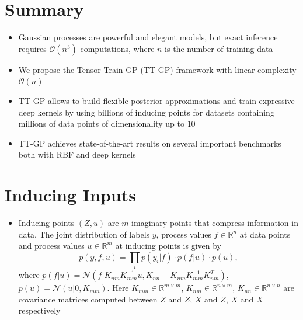 \documentclass[a0,portrait]{a0poster}
\newcommand{\Knn}{K_{nn}}
\newcommand{\Knm}{K_{nm}}
\newcommand{\Kmm}{K_{mm}}
\newcommand{\R}{\mathbb{R}}
\newcommand{\N}{\mathcal{N}}
\newcommand{\bigO}{\mathcal{O}}
\begin{document}
\large


\begin{multicols}{2} %


%

\section*{\LARGE \color{NavyBlue}Summary}

\begin{itemize}
  \item Gaussian processes are powerful and elegant models, but exact inference 
    requires $\bigO(n^3)$ computations, where $n$ is the number of training data
  \item We propose the Tensor Train GP (TT-GP) framework with 
    linear complexity  $\bigO(n)$ 
  \item TT-GP allows to build flexible posterior approximations and train
    expressive deep kernels by using billions of inducing points for datasets
    containing millions of data points of dimensionality up to $10$
  \item TT-GP achieves state-of-the-art results on several important benchmarks
    both with RBF and deep kernels
\end{itemize}

\section*{\LARGE \color{NavyBlue}Inducing Inputs}

\begin{itemize}
  \item Inducing points $(Z, u)$ are $m$ imaginary points that compress information in data.
    The joint distribution of labels $y$, process values $f \in \R^n$ at data points
    and process values $u \in \R^m$ at inducing points is given by
    \[
      p(y, f, u) = \prod_i p(y_i \vert f)\cdot p(f \vert u)\cdot p(u),
    \]
    where 
    $p(f | u) = \N(f | \Knm \Kmm^{-1} u, \Knn - \Knm \Kmm^{-1} \Knm^T)$,
    $p(u)= \N(u | 0, \Kmm)$. 
    Here $K_{mm} \in \R^{m \times m}$,
    $K_{nm} \in \R^{n \times m}$,
    $K_{nn} \in \R^{n \times n}$ are covariance matrices computed between $Z$ and $Z$,
    $X$ and $Z$, $X$ and $X$ respectively


\end{itemize}
\end{multicols}
\end{document}
